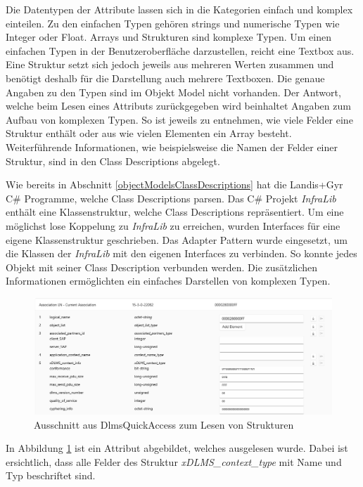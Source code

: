 Die Datentypen der Attribute lassen sich in die Kategorien einfach und komplex einteilen.
Zu den einfachen Typen gehören strings und numerische Typen wie Integer oder Float.
Arrays und Strukturen sind komplexe Typen.
Um einen einfachen Typen in der Benutzeroberfläche darzustellen, reicht eine Textbox aus.
Eine Struktur setzt sich jedoch jeweils aus mehreren Werten zusammen und benötigt deshalb für die Darstellung auch mehrere Textboxen.
Die genaue Angaben zu den Typen sind im Objekt Model nicht vorhanden.
Der Antwort, welche beim Lesen eines Attributs zurückgegeben wird beinhaltet Angaben zum Aufbau von komplexen Typen.
So ist jeweils zu entnehmen, wie viele Felder eine Struktur enthält oder aus wie vielen Elementen ein Array besteht.
Weiterführende Informationen, wie beispielsweise die Namen der Felder einer Struktur, sind in den Class Descriptions abgelegt.

Wie bereits in Abschnitt \ref{objectModelsClassDescriptions} hat die Landis+Gyr C\# Programme, welche Class Descriptions parsen.
Das C\# Projekt \textit{InfraLib} enthält eine Klassenstruktur, welche Class Descriptions repräsentiert.
Um eine möglichst lose Koppelung zu \textit{InfraLib} zu erreichen, wurden Interfaces für eine eigene Klassenstruktur geschrieben.
Das Adapter Pattern \parencite{designPatterns} wurde eingesetzt, um die Klassen der \textit{InfraLib} mit den eigenen Interfaces zu verbinden.
So konnte jedes Objekt mit seiner Class Description verbunden werden.
Die zusätzlichen Informationen ermöglichten ein einfaches Darstellen von komplexen Typen.
\begin{figure}
   \centering
   \includegraphics[width=1.0\textwidth]{gfx/AttributeReadExample.png}
   \caption{
      Ausschnitt aus DlmsQuickAccess zum Lesen von Strukturen
      }
      \label{fig:AttributeReadExample}
   \end{figure}
In Abbildung \ref{fig:AttributeReadExample} ist ein Attribut abgebildet, welches ausgelesen wurde.
Dabei ist ersichtlich, dass alle Felder des Struktur \textit{xDLMS\_context\_type} mit Name und Typ beschriftet sind.

